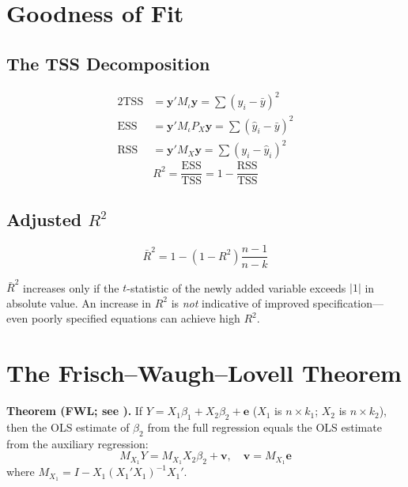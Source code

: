 \section{Goodness of Fit}
\label{sec_GoodnessOfFit}

\subsection{The TSS Decomposition}

\begin{tcolorbox}[keyresult]
\begin{alignat*}{2}
  \text{TSS} &= \mathbf{y}'M_\iota\mathbf{y}
    = \textstyle\sum(y_i-\bar{y})^2 \\
  \text{ESS} &= \mathbf{y}'M_\iota P_X\mathbf{y}
    = \textstyle\sum(\hat{y}_i-\bar{y})^2 \\
  \text{RSS} &= \mathbf{y}'M_X\mathbf{y}
    = \textstyle\sum(y_i-\hat{y}_i)^2
\end{alignat*}
\vspace{-4pt}
\begin{equation}
  R^2 = \frac{\text{ESS}}{\text{TSS}} = 1 - \frac{\text{RSS}}{\text{TSS}}
\end{equation}
\end{tcolorbox}

\subsection{Adjusted $R^2$}

\begin{equation}
  \bar{R}^2 = 1 - (1-R^2)\frac{n-1}{n-k}
\end{equation}

$\bar{R}^2$ increases only if the $t$-statistic of the newly added variable
exceeds $|1|$ in absolute value. An increase in $R^2$ is \emph{not}
indicative of improved specification---even poorly specified equations can
achieve high $R^2$.


\section{The Frisch--Waugh--Lovell Theorem}
\label{sec_FWL}

\begin{tcolorbox}[definition]
\textbf{Theorem (FWL; see \citealt{Lovell2008,Davidson2004}).} If
$Y = X_1\beta_1 + X_2\beta_2 + \mathbf{e}$ ($X_1$ is $n\times k_1$;
$X_2$ is $n\times k_2$), then the OLS estimate of $\beta_2$ from the full
regression equals the OLS estimate from the auxiliary regression:
\begin{equation}
  M_{X_1}Y = M_{X_1}X_2\beta_2 + \mathbf{v}, \quad \mathbf{v} = M_{X_1}\mathbf{e}
\end{equation}
where $M_{X_1} = I - X_1(X_1'X_1)^{-1}X_1'$.
\end{tcolorbox}


